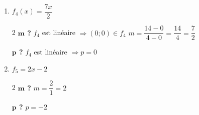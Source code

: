 \begin{enumerate}
\begin{multicols}{2}
                  \textbf{$\bm{p}$ ?}
                  \medbreak
                  $\begin{aligned}[t]
                          \text{La racine est }-2\Rightarrow 0 & = 3\cdot (-2) + p \\
                          p                                    & = 6
                      \end{aligned}$
              \end{multicols}
        \item $f_4(x) = \dfrac{7x}{2}$
              \begin{multicols}{2}
                  \textbf{$\bm{m}$ ?}
                  \medbreak
                  $f_4$ est linéaire $\Rightarrow (0;0) \in f_4$
                  \medbreak
                  $m = \dfrac{14-0}{4-0} = \dfrac{14}{4} = \dfrac{7}{2}$
                  \columnbreak

                  \textbf{$\bm{p}$ ?}
                  \medbreak
                  $f_4$ est linéaire $\Rightarrow p=0$
              \end{multicols}
        \item $f_5 = 2x-2 $
              \begin{multicols}{2}
                  \textbf{$\bm{m}$ ?}
                  \medbreak
                  $m=\dfrac{2}{1} = 2$
                  \columnbreak

                  \textbf{$\bm{p}$ ?}
                  \medbreak
                  $p=-2$
              \end{multicols}
    \end{enumerate}
    \newpage

